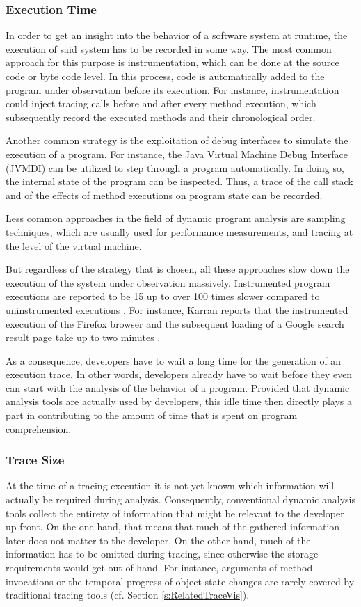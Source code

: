 \subsubsection{Execution Time}
In order to get an insight into the behavior of a software system at runtime, the execution of said system has to be recorded in some way.
The most common approach for this purpose is instrumentation, which can be done at the source code or byte code level.
In this process, code is automatically added to the program under observation before its execution.
For instance, instrumentation could inject tracing calls before and after every method execution, which subsequently record the executed methods and their chronological order.

Another common strategy is the exploitation of debug interfaces to simulate the execution of a program.
For instance, the Java Virtual Machine Debug Interface (JVMDI) can be utilized to step through a program automatically.
In doing so, the internal state of the program can be inspected.
Thus, a trace of the call stack and of the effects of method executions on program state can be recorded.

Less common approaches in the field of dynamic program analysis are sampling techniques, which are usually used for performance measurements, and tracing at the level of the virtual machine.

But regardless of the strategy that is chosen, all these approaches slow down the execution of the system under observation massively.
Instrumented program executions are reported to be 15 up to over 100 times slower compared to uninstrumented executions \cite{pothier_scalable_2007, karran_synctrace:_2013}.
For instance, Karran reports that the instrumented execution of the Firefox browser and the subsequent loading of a Google search result page take up to two minutes \cite{karran_extraction_2013}.

As a consequence, developers have to wait a long time for the generation of an execution trace.
In other words, developers already have to wait before they even can start with the analysis of the behavior of a program.
Provided that dynamic analysis tools are actually used by developers, this idle time then directly plays a part in contributing to the amount of time that is spent on program comprehension.

\subsubsection{Trace Size}
At the time of a tracing execution it is not yet known which information will actually be required during analysis.
Consequently, conventional dynamic analysis tools collect the entirety of information that might be relevant to the developer up front.
On the one hand, that means that much of the gathered information later does not matter to the developer.
On the other hand, much of the information has to be omitted during tracing, since otherwise the storage requirements would get out of hand.
For instance, arguments of method invocations or the temporal progress of object state changes are rarely covered by traditional tracing tools (cf. Section \ref{s:RelatedTraceVis}).

